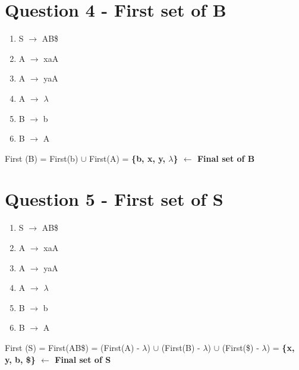 \documentclass{article}
\begin{document}
\section*{Question 4 - First set of B}
\vspace{-1.5em}
\begin{multicols}{2}
  \begin{enumerate}
    \setlength\itemsep{-.25em}
    \item S $\rightarrow$ AB\$
    \item A $\rightarrow$ xaA
    \item A $\rightarrow$ yaA
    \item A $\rightarrow$ $\lambda$
    \item B $\rightarrow$ b
    \item B $\rightarrow$ A
  \end{enumerate}
\setlength{\leftskip}{-12em}
First (B) = First(b) $\cup$  First(A) = \textbf{\{b, x, y, $\lambda$\}  $\leftarrow$ Final set of B}\newline
\newline\newline\newline\newline
\end{multicols}

\section*{Question 5 - First set of S}
\vspace{-1.5em}
\begin{multicols}{2}
  \begin{enumerate}
    \setlength\itemsep{-.25em}
    \item S $\rightarrow$ AB\$
    \item A $\rightarrow$ xaA
    \item A $\rightarrow$ yaA
    \item A $\rightarrow$ $\lambda$
    \item B $\rightarrow$ b
    \item B $\rightarrow$ A
  \end{enumerate}
\setlength{\leftskip}{-12em}
First (S) = First(AB\$) = (First(A) - $\lambda$) $\cup$ (First(B) - $\lambda$) $\cup$ (First(\$) - $\lambda$)\newline
\indent\hspace{.75cm} = \textbf{\{x, y, b, \$\} $\leftarrow$ Final set of S}
\newline\newline\newline
\end{multicols}
\end{document}
